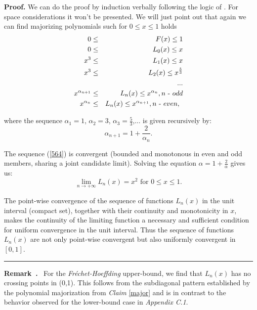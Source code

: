 \documentclass[onecolumn]{article}
\newenvironment{remark}{  \refstepcounter{theorem}  \par\medskip\noindent\textbf{Remark~\thetheorem.}\rmfamily\ }{\par\medskip}
\newenvironment{proof}[1][Proof]{\noindent\textbf{#1.} }{\ \rule{0.5em}{0.5em}}
\begin{document}
\begin{proof}
We can do the proof by induction verbally following the logic of \cite{[3]}.
For space considerations it won't be presented. We will just point out that
again we can find majorizing polynomials such for $0\leq x\leq 1$ holds 
\begin{eqnarray}
0 &\leq &F(x)\leq 1  \label{563} \\
0 &\leq &L_{0}(x)\leq x  \notag \\
x^{3} &\leq &L_{1}(x)\leq x  \notag \\
x^{3} &\leq &L_{2}(x)\leq x^{\frac{5}{3}}  \notag \\
&&...  \notag \\
x^{\alpha _{n+1}} &\leq &L_{n}(x)\leq x^{\alpha _{n}},n\text{ - }odd  \notag
\\
x^{\alpha _{n}} &\leq &L_{n}(x)\leq x^{\alpha _{n+1}},n\text{ - }even,\text{ 
}  \notag
\end{eqnarray}

where the sequence $\alpha _{1}=1$, $\alpha _{2}=3$, $\alpha _{3}=\frac{5}{3}
$,... is given recursively by:%
\begin{equation}
\alpha _{n+1}=1+\frac{2}{\alpha _{n}}.  \label{564}
\end{equation}

The sequence (\ref{564}) is convergent (bounded and monotonous in even and
odd members, sharing a joint candidate limit). Solving the equation $\alpha
=1+\frac{2}{\alpha }$ gives us:%
\begin{equation}
\underset{n\rightarrow +\infty }{\lim }L_{n}(x)=x^{2}\text{ for }0\leq x\leq
1.  \label{565}
\end{equation}

The point-wise convergence of the sequence of functions $L_{n}(x)$ in the
unit interval (compact set), together with their continuity and monotonicity
in $x$, makes the continuity of the limiting function a necessary and
sufficient condition for uniform convergence in the unit interval. Thus the
sequence of functions $L_{n}(x)$ are not only point-wise convergent but also
uniformly convergent in $[0,1]$.
\end{proof}

\begin{remark}
For the \textit{Fr\'{e}chet-Hoeffding} upper-bound, we find that $L_{n}(x)$
has no crossing points in (0,1). This follows from the subdiagonal pattern
established by the polynomial majorization from \textit{Claim} \ref{major}
and is in contrast to the behavior observed for the lower-bound case in 
\textit{Appendix C.1}.
\end{remark}
\end{document}
